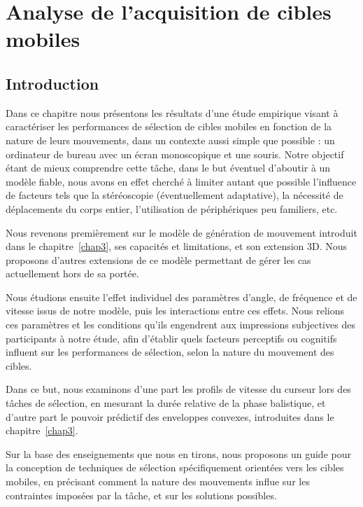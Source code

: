 
\chapter[Analyse de l'acquisition de cibles mobiles]{Analyse de l'acquisition de cibles mobiles}
\minitoc
\label{chap4}
\clearpage

\section{Introduction}
	Dans ce chapitre nous présentons les résultats d'une étude empirique visant à caractériser les performances de sélection de cibles mobiles en fonction de la nature de leurs mouvements, dans un contexte aussi simple que possible : un ordinateur de bureau avec un écran monoscopique et une souris. Notre objectif étant de mieux comprendre cette tâche, dans le but éventuel d'aboutir à un modèle fiable, nous avons en effet cherché à limiter autant que possible l'influence de facteurs tels que la stéréoscopie (éventuellement adaptative), la nécessité de déplacements du corps entier, l'utilisation de périphériques peu familiers, etc. 
	
	Nous revenons premièrement sur le modèle de génération de mouvement introduit dans le chapitre~\ref{chap3}, ses capacités et limitations, et son extension 3D. Nous proposons d'autres extensions de ce modèle permettant de gérer les cas actuellement hors de sa portée.
	
	Nous étudions ensuite l'effet individuel des paramètres d'angle, de fréquence et de vitesse issus de notre modèle, puis les interactions entre ces effets. Nous relions ces paramètres et les conditions qu'ils engendrent aux impressions subjectives des participants à notre étude, afin d'établir quels facteurs perceptifs ou cognitifs influent sur les performances de sélection, selon la nature du mouvement des cibles.

	Dans ce but, nous examinons d'une part les profils de vitesse du curseur lors des tâches de sélection, en mesurant la durée relative de la phase balistique, et d'autre part le pouvoir prédictif des enveloppes convexes, introduites dans le chapitre~\ref{chap3}.
	
	Sur la base des enseignements que nous en tirons, nous proposons un guide pour la conception de techniques de sélection spécifiquement orientées vers les cibles mobiles, en précisant comment la nature des mouvements influe sur les contraintes imposées par la tâche, et sur les solutions possibles.

